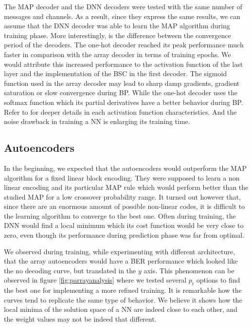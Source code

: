 \documentclass[conference]{IEEEtran}
\begin{document}
The MAP decoder and the DNN decoders were tested with the same number of messages and channels. As a result, since they express the same results, we can assume that the DNN decoder was able to learn the MAP algorithm during training phase. More interestingly, is the difference between the convergence period of the decoders. The one-hot decoder reached its peak performance much faster in comparison with the array decoder in terms of training epochs. We would attribute this increased performance to the activation function of the last layer and the implementation of the BSC in the first decoder. The sigmoid function used in the array decoder may lead to sharp damp gradients, gradient saturation or slow convergence during BP. While the one-hot decoder uses the softmax function which its partial derivatives have a better behavior during BP. Refer to \cite{2018arXiv181103378N} for deeper details in each activation function characteristics. And the noise drawback in training a NN is enlarging its training time.


\subsection{Autoencoders}

In the beginning, we expected that the autoencoders would outperform the MAP algorithm for a fixed linear block encoding. They were supposed to learn a non linear encoding and its particular MAP rule which would perform better than the studied MAP for a low crossover probability range. It turned out however that, since there are an enormous amount of possible non-linear codes, it is difficult to the learning algorithm to converge to the best one. Often during training, the DNN would find a local minimum which its cost function would be very close to zero, even though its performance during prediction phase was far from optimal.

We observed during training, while experimenting with different architecture, that the array autoencoders would have a BER performance which looked like the no decoding curve, but translated in the $y$ axis. This phenomenon can be observed in figure \ref{fig:parrayanalysis} where we tested several $p_t$ options to find the best one for implementing a more refined training. It is remarkable how the curves tend to replicate the same type of behavior. We believe it shows how the local minima of the solution space of a NN are indeed close to each other, and the weight values may not be indeed that different.
\end{document}

